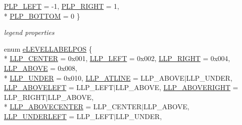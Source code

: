 \begin{DoxyCompactItemize}
\hyperlink{namespacexyplot_a029797c1a02508ee54d5a1d4106c1e89af9794f78f5e814e5093cb5346a32ef5a}{P\-L\-P\-\_\-\-L\-E\-F\-T} = -\/1, 
\hyperlink{namespacexyplot_a029797c1a02508ee54d5a1d4106c1e89a770a257ce28bfbd98926c6dc777dba5b}{P\-L\-P\-\_\-\-R\-I\-G\-H\-T} = 1, 
\\*
\hyperlink{namespacexyplot_a029797c1a02508ee54d5a1d4106c1e89a9879c4f05904c7a442a160dc0137a89c}{P\-L\-P\-\_\-\-B\-O\-T\-T\-O\-M} = 0
 \}
\begin{DoxyCompactList}\small\item\em legend properties \end{DoxyCompactList}\item 
enum \hyperlink{namespacexyplot_aa9c170d2faee24c85ccb4ae1b717cf6f}{e\-L\-E\-V\-E\-L\-L\-A\-B\-E\-L\-P\-O\-S} \{ \\*
\hyperlink{namespacexyplot_aa9c170d2faee24c85ccb4ae1b717cf6fa5fcdc067fea8e4295dc94e185a311b07}{L\-L\-P\-\_\-\-C\-E\-N\-T\-E\-R} = 0x001, 
\hyperlink{namespacexyplot_aa9c170d2faee24c85ccb4ae1b717cf6fa9574e8c81c02e8662fdccf32fb827051}{L\-L\-P\-\_\-\-L\-E\-F\-T} = 0x002, 
\hyperlink{namespacexyplot_aa9c170d2faee24c85ccb4ae1b717cf6fa85fcc95fcca62425a064219b92bdfc6e}{L\-L\-P\-\_\-\-R\-I\-G\-H\-T} = 0x004, 
\hyperlink{namespacexyplot_aa9c170d2faee24c85ccb4ae1b717cf6facad43cc5da51e917418a12cd82560870}{L\-L\-P\-\_\-\-A\-B\-O\-V\-E} = 0x008, 
\\*
\hyperlink{namespacexyplot_aa9c170d2faee24c85ccb4ae1b717cf6fa959c598ddbfc0459d8c6cde7cdf4eb66}{L\-L\-P\-\_\-\-U\-N\-D\-E\-R} = 0x010, 
\hyperlink{namespacexyplot_aa9c170d2faee24c85ccb4ae1b717cf6faec329d3909dc1422b27ab1b633fa9101}{L\-L\-P\-\_\-\-A\-T\-L\-I\-N\-E} = L\-L\-P\-\_\-\-A\-B\-O\-V\-E$\vert$\-L\-L\-P\-\_\-\-U\-N\-D\-E\-R, 
\hyperlink{namespacexyplot_aa9c170d2faee24c85ccb4ae1b717cf6fa6c5b0d5acdab845fea50943cdeb09b02}{L\-L\-P\-\_\-\-A\-B\-O\-V\-E\-L\-E\-F\-T} = L\-L\-P\-\_\-\-L\-E\-F\-T$\vert$\-L\-L\-P\-\_\-\-A\-B\-O\-V\-E, 
\hyperlink{namespacexyplot_aa9c170d2faee24c85ccb4ae1b717cf6fa82643fddf97b393b444ade7a84643375}{L\-L\-P\-\_\-\-A\-B\-O\-V\-E\-R\-I\-G\-H\-T} = L\-L\-P\-\_\-\-R\-I\-G\-H\-T$\vert$\-L\-L\-P\-\_\-\-A\-B\-O\-V\-E, 
\\*
\hyperlink{namespacexyplot_aa9c170d2faee24c85ccb4ae1b717cf6fa97c5bed644308c2800e044d461dbd3e2}{L\-L\-P\-\_\-\-A\-B\-O\-V\-E\-C\-E\-N\-T\-E\-R} = L\-L\-P\-\_\-\-C\-E\-N\-T\-E\-R$\vert$\-L\-L\-P\-\_\-\-A\-B\-O\-V\-E, 
\hyperlink{namespacexyplot_aa9c170d2faee24c85ccb4ae1b717cf6fad12d311622476ceee8ee53c868db49f3}{L\-L\-P\-\_\-\-U\-N\-D\-E\-R\-L\-E\-F\-T} = L\-L\-P\-\_\-\-L\-E\-F\-T$\vert$\-L\-L\-P\-\_\-\-U\-N\-D\-E\-R, 

\end{DoxyCompactItemize}
